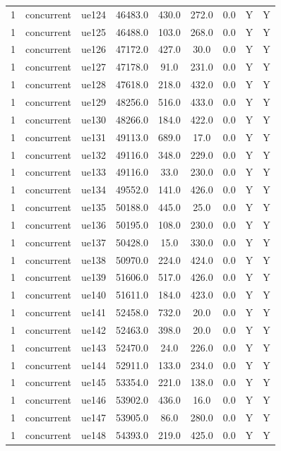 \begin{table}[ht]
\begin{tabular}{|c|c|c|c|c|c|c|c|c|}
1 & concurrent & ue124 & 46483.0 & 430.0 & 272.0 & 0.0 & Y & Y \\
1 & concurrent & ue125 & 46488.0 & 103.0 & 268.0 & 0.0 & Y & Y \\
1 & concurrent & ue126 & 47172.0 & 427.0 & 30.0 & 0.0 & Y & Y \\
1 & concurrent & ue127 & 47178.0 & 91.0 & 231.0 & 0.0 & Y & Y \\
1 & concurrent & ue128 & 47618.0 & 218.0 & 432.0 & 0.0 & Y & Y \\
1 & concurrent & ue129 & 48256.0 & 516.0 & 433.0 & 0.0 & Y & Y \\
1 & concurrent & ue130 & 48266.0 & 184.0 & 422.0 & 0.0 & Y & Y \\
1 & concurrent & ue131 & 49113.0 & 689.0 & 17.0 & 0.0 & Y & Y \\
1 & concurrent & ue132 & 49116.0 & 348.0 & 229.0 & 0.0 & Y & Y \\
1 & concurrent & ue133 & 49116.0 & 33.0 & 230.0 & 0.0 & Y & Y \\
1 & concurrent & ue134 & 49552.0 & 141.0 & 426.0 & 0.0 & Y & Y \\
1 & concurrent & ue135 & 50188.0 & 445.0 & 25.0 & 0.0 & Y & Y \\
1 & concurrent & ue136 & 50195.0 & 108.0 & 230.0 & 0.0 & Y & Y \\
1 & concurrent & ue137 & 50428.0 & 15.0 & 330.0 & 0.0 & Y & Y \\
1 & concurrent & ue138 & 50970.0 & 224.0 & 424.0 & 0.0 & Y & Y \\
1 & concurrent & ue139 & 51606.0 & 517.0 & 426.0 & 0.0 & Y & Y \\
1 & concurrent & ue140 & 51611.0 & 184.0 & 423.0 & 0.0 & Y & Y \\
1 & concurrent & ue141 & 52458.0 & 732.0 & 20.0 & 0.0 & Y & Y \\
1 & concurrent & ue142 & 52463.0 & 398.0 & 20.0 & 0.0 & Y & Y \\
1 & concurrent & ue143 & 52470.0 & 24.0 & 226.0 & 0.0 & Y & Y \\
1 & concurrent & ue144 & 52911.0 & 133.0 & 234.0 & 0.0 & Y & Y \\
1 & concurrent & ue145 & 53354.0 & 221.0 & 138.0 & 0.0 & Y & Y \\
1 & concurrent & ue146 & 53902.0 & 436.0 & 16.0 & 0.0 & Y & Y \\
1 & concurrent & ue147 & 53905.0 & 86.0 & 280.0 & 0.0 & Y & Y \\
1 & concurrent & ue148 & 54393.0 & 219.0 & 425.0 & 0.0 & Y & Y \\

\end{tabular}
\end{table}

